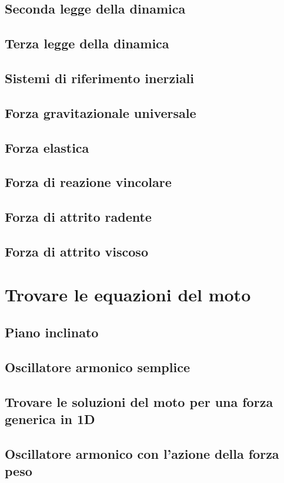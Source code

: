 \documentclass[a4paper]{article}
\begin{document}
\subsection{Seconda legge della dinamica}
\subsection{Terza legge della dinamica}
\subsection{Sistemi di riferimento inerziali}
\subsection{Forza gravitazionale universale}
\subsection{Forza elastica}
\subsection{Forza di reazione vincolare}
\subsection{Forza di attrito radente}
\subsection{Forza di attrito viscoso}

\section{Trovare le equazioni del moto}
\subsection{Piano inclinato}
\subsection{Oscillatore armonico semplice}
\subsection{Trovare le soluzioni del moto per una forza generica in 1D}
\subsection{Oscillatore armonico con l'azione della forza peso}
\end{document}
